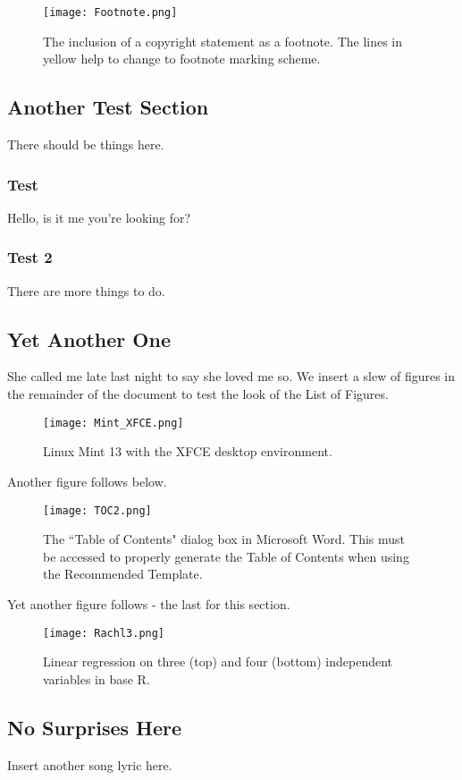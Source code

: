 \begin{figure}[ht!]
\centering
	\texttt{[image: Footnote.png]}
	\caption{The inclusion of a copyright statement as a footnote. The lines in yellow help to change to footnote marking scheme.}
\end{figure}

\subsection{Another Test Section}
There should be things here.


\subsubsection{Test}
Hello, is it me you're looking for?

\subsubsection{Test 2}
There are more things to do.

\subsection{Yet Another One}
She called me late last night to say she loved me so. We insert a slew of figures in the remainder of the document to test the look of the List of Figures.

\begin{figure}[H]
	\centering
	\texttt{[image: Mint\_XFCE.png]}
	\caption{Linux Mint 13 with the XFCE desktop environment.}
\end{figure}

Another figure follows below.

\begin{figure}[H]
	\centering
	\texttt{[image: TOC2.png]}
	\singlespace
	\caption{The ``Table of Contents" dialog box in Microsoft Word. This must be accessed to properly generate the Table of Contents when using the Recommended Template.}
\end{figure}

Yet another figure follows - the last for this section.

\begin{figure}[H]
	\centering
	\texttt{[image: Rachl3.png]}
	\singlespace
	\caption{Linear regression on three (top) and four (bottom) independent variables in base R.}
\end{figure}
 
 \subsection{No Surprises Here}
 Insert another song lyric here.
